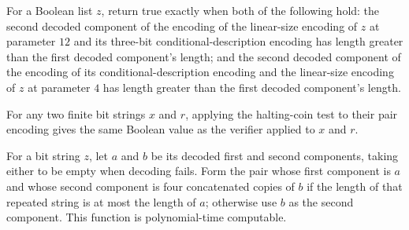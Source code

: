 \begin{definition}
\label{Randomized.haltCoinTest}
\leanok
{}
For a Boolean list $z$, return true exactly when both of the following hold: the second
decoded component of the encoding of the linear-size encoding of $z$ at parameter $12$
and its three-bit conditional-description encoding has length greater than the first
decoded component's length; and the second decoded component of the encoding of its
conditional-description encoding and the linear-size encoding of $z$ at parameter $4$
has length greater than the first decoded component's length.
\end{definition}

\begin{theorem}
\label{Randomized.haltCoinTest_pairEncode}
\leanok
{}
For any two finite bit strings $x$ and $r$, applying the halting-coin test to their pair
encoding gives the same Boolean value as the verifier applied to $x$ and $r$.
\end{theorem}

\begin{theorem}
\label{Randomized.polyTimeComputable_pow4Step}
\leanok
{}
For a bit string $z$, let $a$ and $b$ be its decoded first and second components, taking
either to be empty when decoding fails. Form the pair whose first component is $a$ and
whose second component is four concatenated copies of $b$ if the length of that repeated
string is at most the length of $a$; otherwise use $b$ as the second component. This
function is polynomial-time computable.
\end{theorem}

